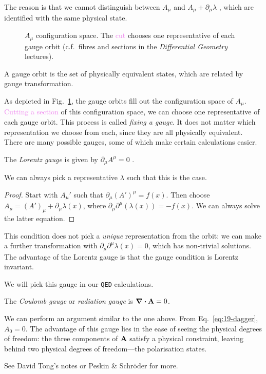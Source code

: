 The reason is that we cannot distinguish between $A_{\mu}$  and $A_{\mu} + \partial_{\mu} \lambda$ , which are identified with the same physical state.
\begin{figure}[tbhp]
  \centering
  \def\svgwidth{0.4\columnwidth}
  
  \caption{$A_{\mu}$ configuration space. The \textcolor{violet}{cut} chooses one representative of each \textcolor{NavyBlue}{gauge orbit} (c.f.~fibres and sections in the \emph{Differential Geometry} lectures).}
  \label{fig:l19f2}
\end{figure} 
\begin{definition}[]
  A gauge orbit is the set of physically equivalent states, which are related by gauge transformation.
\end{definition}
As depicted in Fig.~\ref{fig:l19f2}, the \textcolor{NavyBlue}{gauge orbits} fill out the configuration space of $A_{\mu}$. \textcolor{violet}{Cutting a section} of this configuration space, we can choose one representative of each gauge orbit.
This process is called \emph{fixing a gauge}.
It does not matter which representation we choose from each, since they are all physically equivalent.
There are many possible gauges, some of which make certain calculations easier.

\begin{example}[]
  The \emph{Lorentz gauge} is given by $\partial_{\mu} A^{\mu} = 0$ .
  \begin{claim}
    We can always pick a representative $\lambda$ such that this is the case.
  \end{claim}
  \begin{proof}
    Start with $A_{\mu}'$ such that $\partial_{\mu} (A')^{\mu} = f(x)$.
    Then choose $A_{\mu} = (A')_{\mu} + \partial_{\mu} \lambda(x)$, where $\partial_{\mu} \partial^{\mu} (\lambda(x)) = -f(x)$. We can always solve the latter equation.
  \end{proof}

  This condition does not pick a \emph{unique} representation from the orbit: we can make a further transformation with $\partial_{\mu} \partial^{\mu} \lambda(x) = 0$, which has non-trivial solutions.
  The advantage of the Lorentz gauge is that the gauge condition is Lorentz invariant.
  \begin{remark}
    We will pick this gauge in our \texttt{QED} calculations.
  \end{remark}
\end{example}
\begin{example}[]
  The \emph{Coulomb gauge} or \emph{radiation gauge} is $\div \vb{A} = 0$.\par
  We can perform an argument similar to the one above. From Eq.~\eqref{eq:19-dagger}, $A_0 = 0$.
  The advantage of this gauge lies in the ease of seeing the physical degrees of freedom: the three components of $\vb{A}$ satisfy a physical constraint, leaving behind two physical degrees of freedom---the polarisation states. 
\end{example}
\begin{remark}
  See David Tong's notes or Peskin \& Schröder for more.
\end{remark}
